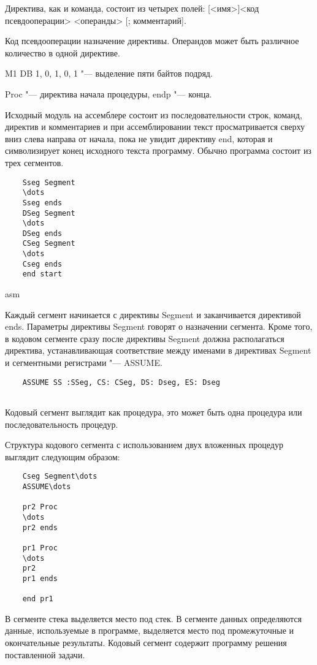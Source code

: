 Директива, как и команда, состоит из четырех полей:
[<имя>]<код псевдооперации> <операнды> [; комментарий].

Код псевдооперации  назначение директивы.
Операндов может быть различное количество в одной директиве.

M1 DB 1, 0, 1, 0, 1 "--- выделение пяти байтов подряд.

Proc "--- директива начала процедуры, endp "--- конца.

Исходный модуль на ассемблере состоит из последовательности строк, команд, директив и комментариев
и при ассемблировании текст просматривается сверху вниз слева направа от начала, пока
не увидит директиву end, которая и символизирует конец исходного текста программу.
Обычно программа состоит из трех сегментов. 

\begin{verbatim}
    Sseg Segment
    \dots
    Sseg ends
    DSeg Segment
    \dots
    DSeg ends
    CSeg Segment
    \dots
    Cseg ends
    end start
\end{verbatim}{asm}

Каждый сегмент начинается с директивы Segment и заканчивается директивой ends. Параметры
директивы Segment говорят о назначении сегмента. Кроме того, в кодовом сегменте сразу
после директивы Segment должна располагаться директива, устанавливающая соответствие
между именами в директивах Segment и сегментными регистрами "--- ASSUME.

\begin{verbatim}
    ASSUME SS :SSeg, CS: CSeg, DS: Dseg, ES: Dseg
    
\end{verbatim}

Кодовый сегмент выглядит как процедура, это может быть одна процедура или последовательность
процедур.

Структура кодового сегмента с использованием двух вложенных процедур выглядит следующим
образом:

\begin{verbatim}
    Cseg Segment\dots
    ASSUME\dots

    pr2 Proc
    \dots
    pr2 ends

    pr1 Proc
    \dots
    pr2
    pr1 ends

    end pr1
\end{verbatim}

В сегменте стека выделяется место под стек.
В сегменте данных определяются данные, используемые в программе, выделяется место
под промежуточные и окончательные результаты.
Кодовый сегмент содержит программу решения поставленной задачи.

